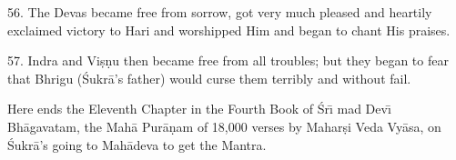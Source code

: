 56. The Devas became free from sorrow, got very much pleased and heartily exclaimed victory to Hari and worshipped Him and began to chant His praises.

57. Indra and Vi\d{s}\d{n}u then became free from all troubles; but they began to fear that Bhrigu (\'Sukr\=a's father) would curse them terribly and without fail.

Here ends the Eleventh Chapter in the Fourth Book of \'Sr\={\i} mad Dev\={\i} Bh\=agavatam, the Mah\=a Pur\=a\d{n}am of 18,000 verses by Mahar\d{s}i Veda Vy\=asa, on \'Sukr\=a's going to Mah\=adeva to get the Mantra.



